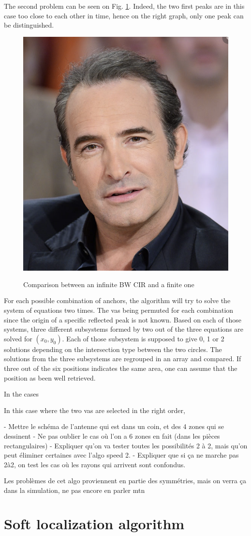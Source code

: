 The second problem can be seen on Fig. \ref{fig:inftofin}. Indeed, the two first peaks are in this case too close to each other in time, hence on the right graph, only one peak can be distinguished. 

\begin{figure}[H]
\centering
\includegraphics[width=.2\linewidth]{Images/Temporary_pic.png}
\label{fig:inftofin}
\caption{Comparison between an infinite BW CIR and a finite one}
\end{figure}

For each possible combination of anchors, the algorithm will try to solve the system of equations two times. The  \gls{vas} being permuted for each combination since the origin of a specific reflected peak is not known. Based on each of those systems, three different subsystems formed by two out of the three equations are solved for $(x_0, y_0)$. Each of those subsystem is supposed to give 0, 1 or 2 solutions depending on the intersection type between the two circles. The solutions from the three subsystems are regrouped in an array and compared. If three out of the six positions indicates the same area, one can assume that the position as been well retrieved.
\vspace{2mm}

In the cases 

In this case where the two \gls{vas} are selected in the right order, 

- Mettre le schéma de l'antenne qui est dans un coin, et des 4 zones qui se dessinent
	- Ne pas oublier le cas où l'on a 6 zones en fait (dans les pièces rectangulaires)
- Expliquer qu'on va tester toutes les possibilités 2 à 2, mais qu'on peut éliminer certaines avec l'algo speed 2.
- Expliquer que si ça ne marche pas 2à2, on test les cas où les rayons qui arrivent sont confondus.


Les problèmes de cet algo proviennent en partie des symmétries, mais on verra ça dans la simulation, ne pas encore en parler mtn

\section{Soft localization algorithm}

